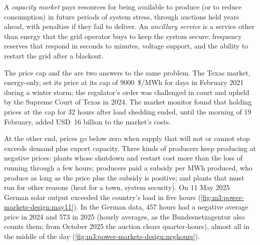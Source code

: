 \begin{definition}\label{def:m3:power-markets-design:capacity}
A \emph{capacity market} pays resources for being available to
produce (or to reduce consumption) in future periods of system stress, through auctions
held years ahead, with penalties if they fail to deliver. An \emph{ancillary
service} is a service other than energy that the grid operator
buys to keep the system secure: frequency reserves that respond in seconds to minutes,
voltage support, and the ability to restart the grid after a blackout.
\end{definition}

The price cap and the  are two answers to the same problem. The Texas
market, energy-only, set its price at its cap of \qty{9000}{\$/MWh} for days in February
2021 during a winter storm; the regulator's order was challenged in court and upheld by the
Supreme Court of Texas in 2024. The market monitor found that holding prices at the cap for 32
hours after load shedding ended, until the morning of 19 February, added USD~16 billion to the
market's costs.

At the other end, prices go below zero when supply that will not or cannot stop exceeds
demand plus export capacity. Three kinds of producers keep producing at negative prices:
plants whose shutdown and restart cost more than the loss of running through a few hours;
producers paid a subsidy per MWh produced, who produce as long as the price plus the
subsidy is positive; and plants that must run for other reasons (heat for a town,
system security). On 11 May 2025 German solar output exceeded the country's load in five
hours (\cref{fig:m3:power-markets-design:may11}). In the German data, 457 hours had a negative
average price in 2024 and 573 in 2025 (hourly averages, as the Bundesnetzagentur also counts
them; from October 2025 the auction clears quarter-hours), almost all in the middle of the day
(\cref{fig:m3:power-markets-design:neghours}).

